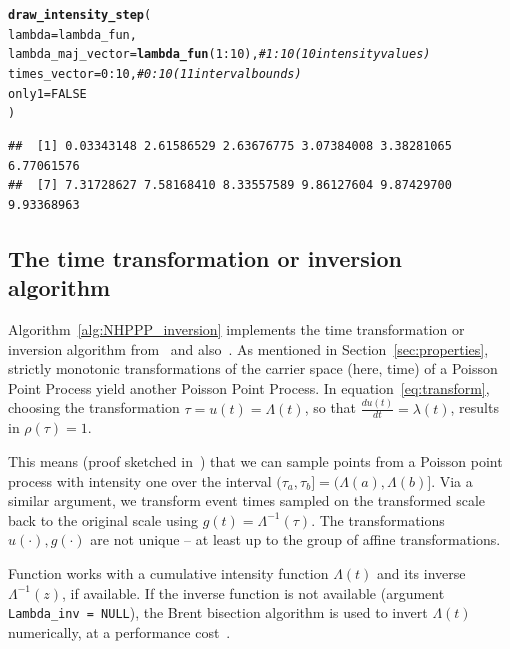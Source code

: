 \documentclass[article,nojss]{jss}\usepackage[]{graphicx}\usepackage[]{xcolor}
\makeatletter
\newcommand{\hlnum}[1]{\textcolor[rgb]{0.686,0.059,0.569}{#1}}%
\newcommand{\hlcom}[1]{\textcolor[rgb]{0.678,0.584,0.686}{\textit{#1}}}%
\newcommand{\hlopt}[1]{\textcolor[rgb]{0,0,0}{#1}}%
\newcommand{\hlstd}[1]{\textcolor[rgb]{0.345,0.345,0.345}{#1}}%
\newcommand{\hlkwc}[1]{\textcolor[rgb]{0.333,0.667,0.333}{#1}}%
\newcommand{\hlkwd}[1]{\textcolor[rgb]{0.737,0.353,0.396}{\textbf{#1}}}%
\newenvironment{kframe}{%
 \def\at@end@of@kframe{}%
 \ifinner\ifhmode%
  \def\at@end@of@kframe{\end{minipage}}%
  \begin{minipage}{\columnwidth}%
 \fi\fi%
 \def\FrameCommand##1{\hskip\@totalleftmargin \hskip-\fboxsep
 \colorbox{shadecolor}{##1}\hskip-\fboxsep
     \hskip-\linewidth \hskip-\@totalleftmargin \hskip\columnwidth}%
 \MakeFramed {\advance\hsize-\width
   \@totalleftmargin\z@ \linewidth\hsize
   \@setminipage}}%
 {\par\unskip\endMakeFramed%
 \at@end@of@kframe}
\newenvironment{knitrout}{}{} %
\newcommand{\der}[2]{\frac{d {#1}} {d{#2}}}
\newcommand{\fct}[1]{\code{#1()}}
\makeatother
\begin{document}
\begin{knitrout}
\color{fgcolor}\begin{kframe}
\begin{alltt}
\hlkwd{draw_intensity_step}\hlstd{(}
  \hlkwc{lambda} \hlstd{= lambda_fun,}
  \hlkwc{lambda_maj_vector} \hlstd{=} \hlkwd{lambda_fun}\hlstd{(}\hlnum{1}\hlopt{:}\hlnum{10}\hlstd{),} \hlcom{# 1:10 (10 intensity values)}
  \hlkwc{times_vector} \hlstd{=} \hlnum{0}\hlopt{:}\hlnum{10}\hlstd{,} \hlcom{# 0:10 (11 interval bounds)}
  \hlkwc{only1} \hlstd{=} \hlnum{FALSE}
\hlstd{)}
\end{alltt}
\begin{verbatim}
##  [1] 0.03343148 2.61586529 2.63676775 3.07384008 3.38281065 6.77061576
##  [7] 7.31728627 7.58168410 8.33557589 9.86127604 9.87429700 9.93368963
\end{verbatim}
\end{kframe}
\end{knitrout}

\subsection{The time transformation or inversion algorithm}\label{sec:inversion}
Algorithm~\ref{alg:NHPPP_inversion} implements the time transformation or inversion algorithm from~\citet{Cinlar1975inversion} and also~\citet[par. 4.2]{cox1965theory}. As mentioned in Section~\ref{sec:properties}, strictly monotonic transformations of the carrier space (here, time) of a Poisson Point Process yield another Poisson Point Process. In equation~\eqref{eq:transform}, choosing the transformation $\tau = u(t) = \Lambda(t)$, so that $\der{u(t)}{t} = \lambda(t)$, results in $\rho(\tau) = 1$.

This means (proof sketched in~\citet[par. 4.2]{cox1965theory}) that we can sample points from a Poisson point process with intensity one over the interval $(\tau_a, \tau_b] = (\Lambda(a), \Lambda(b)]$. Via a similar argument, we transform event times sampled on the transformed scale back to the original scale using $g(t)=\Lambda^{-1}(\tau)$. The transformations $u(\cdot), g(\cdot)$ are not unique -- at least up to the group of affine transformations.

Function \fct{draw\_cumulative\_intensity\_inversion} works with a cumulative intensity function $\Lambda(t)$ and its inverse $\Lambda^{-1}(z)$, if available. If the inverse function is not available (argument \texttt{Lambda\_inv = NULL}), the Brent bisection algorithm is used to invert $\Lambda(t)$ numerically, at a performance cost~\citep{brent-bisection}.
\end{document}
